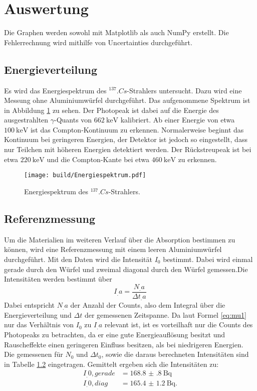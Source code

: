 \section{Auswertung}
\label{sec:Auswertung}

Die Graphen werden sowohl mit Matplotlib \cite{matplotlib} als auch NumPy \cite{numpy} erstellt. Die Fehlerrechnung wird mithilfe von Uncertainties \cite{uncertainties} durchgeführt.

\subsection{Energieverteilung}

Es wird das Energiespektrum des $^{137}.{Cs}$-Strahlers untersucht. Dazu wird eine Messung ohne Aluminiumwürfel durchgeführt. Das aufgenommene Spektrum ist in Abbildung \ref{fig:energiespektrum} zu sehen. Der Photopeak ist dabei auf die Energie des ausgestrahlten $\gamma$-Quants von $\SI{662}{\kilo\electronvolt}$ kalibriert. Ab einer Energie von etwa $\SI{100}{\kilo\electronvolt}$ ist das Compton-Kontinuum zu erkennen. Normalerweise beginnt das Kontinuum bei geringeren Energien, der Detektor ist jedoch so eingestellt, dass nur Teilchen mit höheren Energien detektiert werden. Der Rückstreupeak ist bei etwa $\SI{220}{\kilo\electronvolt}$ und die Compton-Kante bei etwa $\SI{460}{\kilo\electronvolt}$ zu erkennen.

\begin{figure}
\centering
\texttt{[image: build/Energiespektrum.pdf]}
\caption{Energiespektrum des $^{137}.{Cs}$-Strahlers.}
\label{fig:energiespektrum}
\end{figure}

\subsection{Referenzmessung}

Um die Materialien im weiteren Verlauf über die Absorption bestimmen zu können, wird eine Referenzmessung mit einem leeren Aluminiumwürfel durchgeführt. Mit den Daten wird die Intensität $I_0$ bestimmt. Dabei wird einmal gerade durch den Würfel und zweimal diagonal durch den Würfel gemessen.Die Intensitäten werden bestimmt über
\begin{equation}
I_.a = \frac{N_.a}{\Delta t_.a}
\end{equation}
Dabei entspricht $N_.a$ der Anzahl der Counts, also dem Integral über die Energieverteilung und $\Delta t$ der gemessenen Zeitspanne. Da laut Formel \eqref{eq:mu1} nur das Verhältnis von $I_0$ zu $I_.a$ relevant ist, ist es vorteilhaft nur die Counts des Photopeaks zu betrachten, da er eine gute Energieauflösung besitzt und Rauscheffekte einen geringeren Einfluss besitzen, als bei niedrigeren Energien.\\
Die gemessenen für $N_0$ und $\Delta t_0$, sowie die daraus berechneten Intensitäten sind in Tabelle \ref{} eingetragen.
Gemittelt ergeben sich die Intensitäten zu:
\begin{align*}
I_.{0,gerade} &= \SI{168.8(8)}{\becquerel} \\
I_.{0,diag} &= \SI{165.4(12)}{\becquerel} \text{.}
\end{align*}


